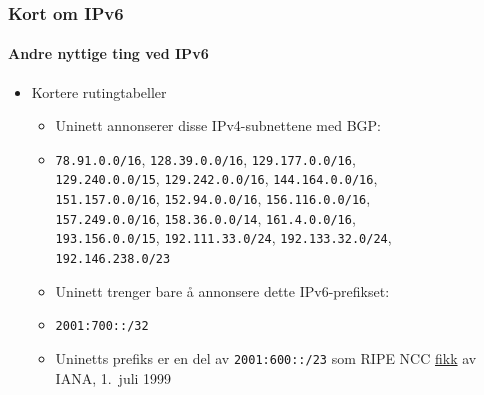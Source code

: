 \begin{frame}%
  \frametitle{Kort om IPv6}
  \framesubtitle{Andre nyttige ting ved IPv6}
  \begin{itemize}%
  \item Kortere rutingtabeller
    \begin{itemize}%
    \item Uninett annonserer disse IPv4-subnettene med BGP:
    \item \texttt{78.91.0.0/16}, \hfill\alert<2>{\texttt{128.39.0.0/16}}, \hfill\texttt{129.177.0.0/16},\\
      \texttt{129.240.0.0/15}, \hfill\texttt{129.242.0.0/16}, \hfill\texttt{144.164.0.0/16},\\
      \texttt{151.157.0.0/16}, \hfill\texttt{152.94.0.0/16}, \hfill\texttt{156.116.0.0/16},\\
      \texttt{157.249.0.0/16}, \hfill\texttt{158.36.0.0/14}, \hfill\texttt{161.4.0.0/16},\\
      \texttt{193.156.0.0/15}, \hfill\texttt{192.111.33.0/24}, \hfill\texttt{192.133.32.0/24},\\
      \hfill\texttt{192.146.238.0/23}\hfill\null
    \item Uninett trenger bare å annonsere dette IPv6-prefikset:
    \item \texttt{2001:700::/32}
    \item Uninetts prefiks er en del av \texttt{2001:600::/23} som
      RIPE NCC
      \href{http://www.iana.org/assignments/ipv6-unicast-address-assignments/ipv6-unicast-address-assignments.xhtml}{fikk}
      av IANA, 1.~juli 1999
    \end{itemize}
  \end{itemize}
\end{frame}

